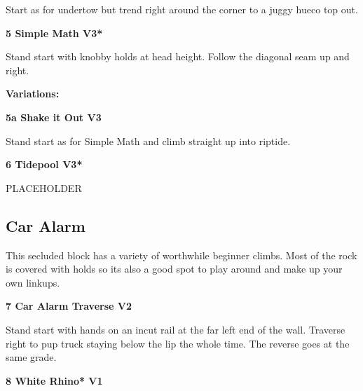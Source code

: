\begin{multicols}{2}
			\begin{adjustwidth}{0.5cm}{}				
			Start as for undertow but trend right around the corner to a juggy hueco top out.
			\end{adjustwidth}
			\label{rt:Simple Math}
\colorbox{green!20}{
\parbox{0.95\linewidth}{
\textbf{
5 Simple Math V3*  
}
}
}

			\begin{adjustwidth}{0.5cm}{}				
			Stand start with knobby holds at head height. Follow the diagonal seam up and right.
			\end{adjustwidth}
				\begin{adjustwidth}{0.5cm}{}				
				\textbf{Variations:} \newline
					\label{vr:Shake it Out}
\colorbox{green!20}{
\parbox{0.95\linewidth}{
\textbf{
5a Shake it Out V3  
}
}
}

					\begin{adjustwidth}{0.5cm}{}				
					Stand start as for Simple Math and climb straight up into riptide.
					\end{adjustwidth}
				\end{adjustwidth}
			\label{rt:Tidepool}
\colorbox{green!20}{
\parbox{0.95\linewidth}{
\textbf{
6 Tidepool V3*  
}
}
}

			\begin{adjustwidth}{0.5cm}{}				
			PLACEHOLDER
			\end{adjustwidth}

		\subsection*{Car Alarm}\label{bf:Car Alarm}
		This secluded block has a variety of worthwhile beginner climbs. Most of the rock is covered with holds so its also a good spot to play around and make up your own linkups.\\
	
			\label{rt:Car Alarm Traverse}
\colorbox{green!20}{
\parbox{0.95\linewidth}{
\textbf{
7 Car Alarm Traverse V2  
}
}
}

			\begin{adjustwidth}{0.5cm}{}				
			Stand start with hands on an incut rail at the far left end of the wall. Traverse right to pup truck staying below the lip the whole time. The reverse goes at the same grade.
			\end{adjustwidth}
			\label{rt:White Rhino}
\colorbox{green!20}{
\parbox{0.95\linewidth}{
\textbf{
8 White Rhino* V1  
}
}
}


\end{multicols}
